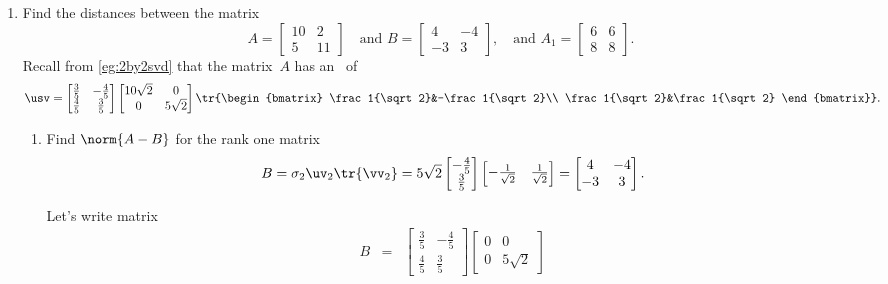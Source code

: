 \begin{example}
\begin{enumerate}
\item Find the distances between the matrix
\begin{equation*}
A=\begin{bmatrix} 10&2\\5&11 \end{bmatrix}
\quad\text{and }B=\begin{bmatrix} 4&-4\\-3&3 \end{bmatrix},
\quad\text{and } A_1=\begin{bmatrix} 6&6\\8&8 \end{bmatrix}.
\end{equation*}
Recall from \cref{eg:2by2svd} that the matrix~\(A\) has an \svd\ of
\begin{equation*}
\usv=\begin{bmatrix} \frac35&-\frac45\\\frac45&\frac35 \end{bmatrix}
\begin{bmatrix} 10\sqrt2&0\\0&5\sqrt2 \end{bmatrix}
\tr{\begin{bmatrix} \frac1{\sqrt2}&-\frac1{\sqrt2}\\ \frac1{\sqrt2}&\frac1{\sqrt2} \end{bmatrix}}.
\end{equation*}
\begin{enumerate}
\item Find \(\norm{A-B}\) for the rank one matrix 
\begin{equation*}
B=\sigma_2\uv_2\tr{\vv_2}
=5\sqrt2\begin{bmatrix} -\frac45\\\frac35 \end{bmatrix}
\begin{bmatrix} -\frac1{\sqrt2}&\frac1{\sqrt2} \end{bmatrix}
=\begin{bmatrix} 4&-4\\-3&3 \end{bmatrix}.
\end{equation*}
\begin{solution} 
Let's write matrix
\begin{eqnarray*}
B&=&\begin{bmatrix} \frac35&-\frac45\\\frac45&\frac35 \end{bmatrix}
\begin{bmatrix} 0&0\\0&5\sqrt2 \end{bmatrix}

\end{eqnarray*}
\end{solution}
\end{enumerate}
\end{enumerate}
\end{example}
